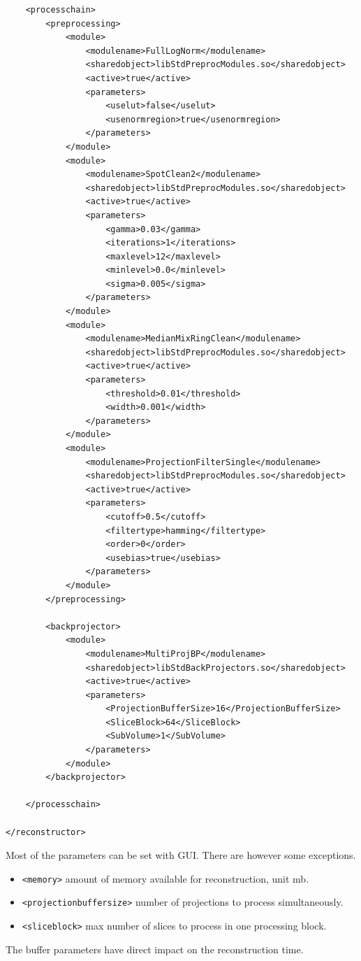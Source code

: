 \documentclass[a4paper]{scrreprt}
\begin{document}
\begin{verbatim}
    <processchain>
        <preprocessing>
            <module>
                <modulename>FullLogNorm</modulename>
                <sharedobject>libStdPreprocModules.so</sharedobject>
                <active>true</active>
                <parameters>
                    <uselut>false</uselut>
                    <usenormregion>true</usenormregion>
                </parameters>
            </module>
            <module>
                <modulename>SpotClean2</modulename>
                <sharedobject>libStdPreprocModules.so</sharedobject>
                <active>true</active>
                <parameters>
                    <gamma>0.03</gamma>
                    <iterations>1</iterations>
                    <maxlevel>12</maxlevel>
                    <minlevel>0.0</minlevel>
                    <sigma>0.005</sigma>
                </parameters>
            </module>
            <module>
                <modulename>MedianMixRingClean</modulename>
                <sharedobject>libStdPreprocModules.so</sharedobject>
                <active>true</active>
                <parameters>
                    <threshold>0.01</threshold>
                    <width>0.001</width>
                </parameters>
            </module>
            <module>
                <modulename>ProjectionFilterSingle</modulename>
                <sharedobject>libStdPreprocModules.so</sharedobject>
                <active>true</active>
                <parameters>
                    <cutoff>0.5</cutoff>
                    <filtertype>hamming</filtertype>
                    <order>0</order>
                    <usebias>true</usebias>
                </parameters>
            </module>
        </preprocessing>

        <backprojector>
            <module>
                <modulename>MultiProjBP</modulename>
                <sharedobject>libStdBackProjectors.so</sharedobject>
                <active>true</active>
                <parameters>
                    <ProjectionBufferSize>16</ProjectionBufferSize>
                    <SliceBlock>64</SliceBlock>
                    <SubVolume>1</SubVolume>
                </parameters>
            </module>
        </backprojector>

    </processchain>

</reconstructor>
\end{verbatim}
Most of the parameters can be set with GUI. There are however some exceptions.
\begin{itemize}
\item \verb+<memory>+ amount of memory available for reconstruction, unit mb.
\item \verb+<projectionbuffersize>+ number of projections to process simultaneously.
\item \verb+<sliceblock>+ max number of slices to process in one processing block.
\end{itemize}
The buffer parameters have direct impact on the reconstruction time.
\end{document}
